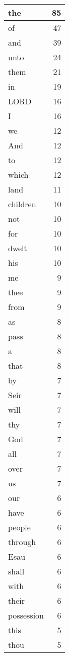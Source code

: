 \begin{center}
\begin{longtable}{l|r}
\hline \hline
\endlastfoot
the & 85 \\ \hline
of & 47 \\ \hline
and & 39 \\ \hline
unto & 24 \\ \hline
them & 21 \\ \hline
in & 19 \\ \hline
LORD & 16 \\ \hline
I & 16 \\ \hline
we & 12 \\ \hline
And & 12 \\ \hline
to & 12 \\ \hline
which & 12 \\ \hline
land & 11 \\ \hline
children & 10 \\ \hline
not & 10 \\ \hline
for & 10 \\ \hline
dwelt & 10 \\ \hline
his & 10 \\ \hline
me & 9 \\ \hline
thee & 9 \\ \hline
from & 9 \\ \hline
as & 8 \\ \hline
pass & 8 \\ \hline
a & 8 \\ \hline
that & 8 \\ \hline
by & 7 \\ \hline
Seir & 7 \\ \hline
will & 7 \\ \hline
thy & 7 \\ \hline
God & 7 \\ \hline
all & 7 \\ \hline
over & 7 \\ \hline
us & 7 \\ \hline
our & 6 \\ \hline
have & 6 \\ \hline
people & 6 \\ \hline
through & 6 \\ \hline
Esau & 6 \\ \hline
shall & 6 \\ \hline
with & 6 \\ \hline
their & 6 \\ \hline
possession & 6 \\ \hline
this & 5 \\ \hline
thou & 5 \\ \hline

\end{longtable}
\end{center}
